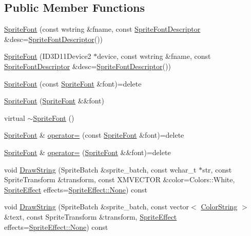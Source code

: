 \subsection*{Public Member Functions}
\begin{DoxyCompactItemize}
\item 
\hyperlink{classmage_1_1_sprite_font_a081eb41de898a96ecd8f0b5bde3987d9}{Sprite\+Font} (const wstring \&fname, const \hyperlink{structmage_1_1_sprite_font_descriptor}{Sprite\+Font\+Descriptor} \&desc=\hyperlink{structmage_1_1_sprite_font_descriptor}{Sprite\+Font\+Descriptor}())
\item 
\hyperlink{classmage_1_1_sprite_font_ae9aaa257b25968d4681140c1594fc334}{Sprite\+Font} (I\+D3\+D11\+Device2 $\ast$device, const wstring \&fname, const \hyperlink{structmage_1_1_sprite_font_descriptor}{Sprite\+Font\+Descriptor} \&desc=\hyperlink{structmage_1_1_sprite_font_descriptor}{Sprite\+Font\+Descriptor}())
\item 
\hyperlink{classmage_1_1_sprite_font_a5df751fe06abda25127fdd9222e41948}{Sprite\+Font} (const \hyperlink{classmage_1_1_sprite_font}{Sprite\+Font} \&font)=delete
\item 
\hyperlink{classmage_1_1_sprite_font_ad1ba3d6947515b36b40b037a2760df29}{Sprite\+Font} (\hyperlink{classmage_1_1_sprite_font}{Sprite\+Font} \&\&font)
\item 
virtual \hyperlink{classmage_1_1_sprite_font_acbf50687b4a5dbb2ff1ad73ecc89b7f1}{$\sim$\+Sprite\+Font} ()
\item 
\hyperlink{classmage_1_1_sprite_font}{Sprite\+Font} \& \hyperlink{classmage_1_1_sprite_font_a3f95359a336adc87088eefe3103a770b}{operator=} (const \hyperlink{classmage_1_1_sprite_font}{Sprite\+Font} \&font)=delete
\item 
\hyperlink{classmage_1_1_sprite_font}{Sprite\+Font} \& \hyperlink{classmage_1_1_sprite_font_ab00b7f5c2740faf52ea778d94ae704bd}{operator=} (\hyperlink{classmage_1_1_sprite_font}{Sprite\+Font} \&\&font)=delete
\item 
void \hyperlink{classmage_1_1_sprite_font_a14b29a1669b3769bd09664b3b1685b43}{Draw\+String} (Sprite\+Batch \&sprite\+\_\+batch, const wchar\+\_\+t $\ast$str, const Sprite\+Transform \&transform, const X\+M\+V\+E\+C\+T\+OR \&color=Colors\+::\+White, \hyperlink{namespacemage_a9cfe18123066ba4236f548f9de75d881}{Sprite\+Effect} effects=\hyperlink{namespacemage_a9cfe18123066ba4236f548f9de75d881a6adf97f83acf6453d4a6a4b1070f3754}{Sprite\+Effect\+::\+None}) const
\item 
void \hyperlink{classmage_1_1_sprite_font_a10fee860b9ccbc3063c1721deb7688e5}{Draw\+String} (Sprite\+Batch \&sprite\+\_\+batch, const vector$<$ \hyperlink{structmage_1_1_color_string}{Color\+String} $>$ \&text, const Sprite\+Transform \&transform, \hyperlink{namespacemage_a9cfe18123066ba4236f548f9de75d881}{Sprite\+Effect} effects=\hyperlink{namespacemage_a9cfe18123066ba4236f548f9de75d881a6adf97f83acf6453d4a6a4b1070f3754}{Sprite\+Effect\+::\+None}) const

\end{DoxyCompactItemize}
